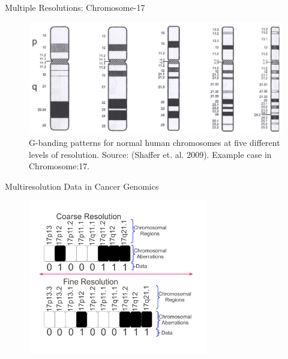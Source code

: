 \documentclass[first=dgreen,second=purple,logo=redexc]{aaltoslides}
\begin{document}

\begin{frame}{Multiple Resolutions: Chromosome-17}
\begin{figure}
\includegraphics[width=11 cm]{figures/bands17}
\caption{G-banding patterns for normal human chromosomes at five different levels of resolution. Source: (Shaffer et. al. 2009). Example case in Chromosome:17.}
\end{figure}
\end{frame}


\begin{frame} {Multiresolution Data in Cancer Genomics} 

\vspace{-7mm}

\begin{figure}
\centering
  \includegraphics[width=0.7\textwidth]{figures/data}
\end{figure}

\vspace{-7mm}


\end{frame}
\end{document}
